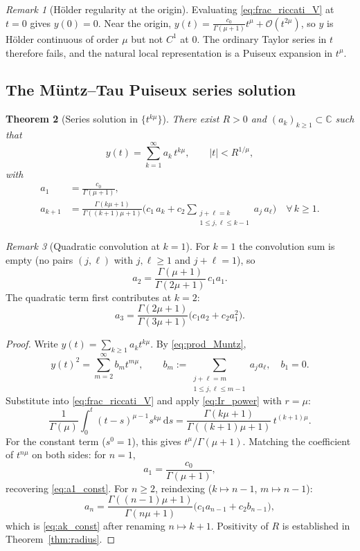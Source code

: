 \documentclass[12pt,a4paper]{amsart}
\newcommand{\dd}{\mathrm{d}}
\newcommand{\assign}{:=}
\theoremstyle{plain}
\newtheorem{theorem}{Theorem}[section]
\theoremstyle{definition}
\theoremstyle{remark}
\newtheorem{remark}[theorem]{Remark}
\begin{document}
\begin{remark}[H\"older regularity at the origin]\label{rem:regularity}
Evaluating \eqref{eq:frac_riccati_V} at $t=0$ gives $y(0)=0$. Near the
origin, $y(t)=\frac{c_0}{\Gamma(\mu+1)}t^{\mu}+\mathcal{O}(t^{2\mu})$, so
$y$ is H\"older continuous of order $\mu$ but not $C^1$ at $0$. The ordinary
Taylor series in $t$ therefore fails, and the natural local representation is
a Puiseux expansion in $t^\mu$.
\end{remark}

\subsection{The M\"untz--Tau Puiseux series solution}

\begin{theorem}[Series solution in $\{t^{k\mu}\}$]\label{thm:riccati_series}
There exist $R>0$ and $(a_k)_{k\ge 1}\subset\mathbb{C}$ such that
\begin{equation}\label{eq:y_series}
  y(t) = \sum_{k=1}^{\infty}a_k\,t^{k\mu},\qquad |t|<R^{1/\mu},
\end{equation}
with
\begin{align}
  a_1 &= \frac{c_0}{\Gamma(\mu+1)},
  \label{eq:a1_const}\\
  a_{k+1} &= \frac{\Gamma(k\mu+1)}{\Gamma((k+1)\mu+1)}
    \Biggl(c_1\,a_k + c_2\!\!\!\!\sum_{\substack{j+\ell=k\\1\le j,\ell\le k-1}}
    \!\!\!\! a_j\,a_{\ell}\Biggr)
  \quad\forall\,k\ge 1.
  \label{eq:ak_const}
\end{align}
\end{theorem}

\begin{remark}[Quadratic convolution at $k=1$]\label{rem:conv_k1}
For $k=1$ the convolution sum is empty (no pairs $(j,\ell)$ with $j,\ell\ge 1$
and $j+\ell=1$), so
\[
  a_2 = \frac{\Gamma(\mu+1)}{\Gamma(2\mu+1)}\,c_1 a_1.
\]
The quadratic term first contributes at $k=2$:
\[
  a_3 = \frac{\Gamma(2\mu+1)}{\Gamma(3\mu+1)}\bigl(c_1 a_2+c_2 a_1^2\bigr).
\]
\end{remark}

\begin{proof}
Write $y(t)=\sum_{k\ge 1}a_k t^{k\mu}$. By \eqref{eq:prod_Muntz},
\[
  y(t)^2 = \sum_{m=2}^{\infty}b_m t^{m\mu},\qquad
  b_m\assign\sum_{\substack{j+\ell=m\\1\le j,\ell\le m-1}}a_j a_{\ell},
  \quad b_1=0.
\]
Substitute into \eqref{eq:frac_riccati_V} and apply \eqref{eq:Ir_power}
with $r=\mu$:
\[
  \frac{1}{\Gamma(\mu)}\int_0^t(t-s)^{\mu-1}s^{k\mu}\,\dd s
  = \frac{\Gamma(k\mu+1)}{\Gamma((k+1)\mu+1)}\,t^{(k+1)\mu}.
\]
For the constant term ($s^0=1$), this gives $t^{\mu}/\Gamma(\mu+1)$.
Matching the coefficient of $t^{n\mu}$ on both sides: for $n=1$,
\[
  a_1 = \frac{c_0}{\Gamma(\mu+1)},
\]
recovering \eqref{eq:a1_const}. For $n\ge 2$, reindexing ($k\mapsto n-1$,
$m\mapsto n-1$):
\[
  a_n = \frac{\Gamma((n-1)\mu+1)}{\Gamma(n\mu+1)}
        \bigl(c_1 a_{n-1}+c_2 b_{n-1}\bigr),
\]
which is \eqref{eq:ak_const} after renaming $n\mapsto k+1$.
Positivity of $R$ is established in Theorem~\ref{thm:radius}.
\end{proof}
\end{document}
